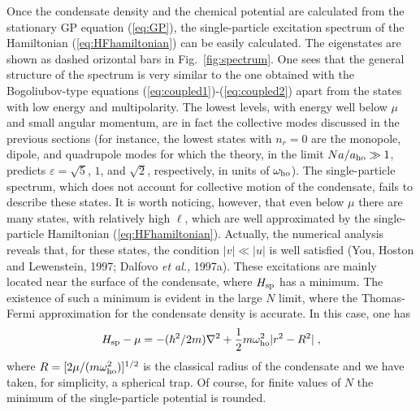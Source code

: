 Once the condensate density and the chemical potential
are calculated from the stationary GP equation (\ref{eq:GP}), the 
single-particle excitation spectrum of the Hamiltonian 
(\ref{eq:HFhamiltonian}) can be easily calculated. The eigenstates 
are shown as dashed orizontal bars in Fig.~\ref{fig:spectrum}. One 
sees that the general structure of the spectrum is very similar to 
the one obtained with the Bogoliubov-type equations 
(\ref{eq:coupled1})-(\ref{eq:coupled2}) apart from the states with 
low energy and multipolarity.  The lowest levels,  with energy
well below $\mu$ and small angular momentum, are in fact the collective 
modes discussed in the previous sections (for instance, the lowest 
states with $n_r=0$ are the monopole, dipole, and quadrupole modes 
for which the theory, in the limit $Na/a_{\rm ho} \gg 1$, predicts 
$\varepsilon= \sqrt{5}$, $1$, and $\sqrt{2}$, respectively, in units
of $\omega_{\rm ho}$). The single-particle spectrum, which does 
not account for collective motion of the condensate, fails to describe 
these states. It is worth noticing, however, that even below $\mu$ there 
are many states, with relatively high $\ell$, which are well approximated 
by  the single-particle Hamiltonian (\ref{eq:HFhamiltonian}).  
Actually, the  numerical analysis reveals that, for these states,
the condition $|v| \ll |u|$ is well satisfied (You, Hoston and 
Lewenstein, 1997; Dalfovo {\it et al.}, 1997a).  These 
excitations are mainly located near the surface of the condensate, 
where $H_{\rm sp}$ has a minimum. The existence of such
a minimum is evident in the large $N$ limit, where the Thomas-Fermi
approximation for the condensate density is accurate. In this case, one 
has
\begin{equation}
H_{\rm sp}-\mu =  - (\hbar^2/2m) \nabla^2  + {1\over 2} m \omega^2_{\rm ho}
|r^2 -R^2| \; ,
\label{eq:largeNHF}
\end{equation}
where $R=[2 \mu/(m\omega^2_{\rm ho})]^{1/2}$ is the classical radius
of the condensate and we have taken, for simplicity, a spherical trap.
Of course, for finite values of $N$ the minimum of the single-particle
potential is rounded. 

